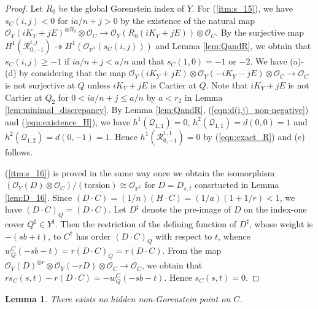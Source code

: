 \documentclass[a4paper,11pt]{amsart}
\newtheorem{lemma}[theorem]{Lemma}
\theoremstyle{definition}
\theoremstyle{remark}
\numberwithin{equation}{section}
\newcommand{\bP}{{\mathbb P}}
\newcommand{\cO}{{\mathcal O}}
\newcommand{\cQ}{{\mathcal Q}}
\newcommand{\calR}{{\mathcal R}}
\newcommand{\torsion}{\mathrm{torsion}}
\begin{document}
\begin{proof}
Let $R_0$ be the global Gorenstein index of $Y$.
For (\ref{itm:s_15}),
we have $s_C(i,j)<0$ for $ia/n+j>0$ by the existence of the natural map
$\cO_Y(iK_Y+jE)^{\otimes R_0} \otimes \cO_C
\to \cO_Y(R_0(iK_Y+jE)) \otimes \cO_C$.
By the surjective map
$H^1(\calR_{0,-1}^{i,j}) \twoheadrightarrow H^1(\cO_{\bP^1}(s_C(i,j)))$
and Lemma \ref{lem:QandR},
we obtain that $s_C(i,j)\ge-1$ if $ia/n+j<a/n$ and that $s_C(1,0)=-1$ or $-2$.
We have (a)-(d) by considering that the map
$\cO_Y(iK_Y+jE) \otimes \cO_Y(-iK_Y-jE) \otimes \cO_C \to \cO_C$
is not surjective at $Q$ unless $iK_Y+jE$ is Cartier at $Q$.
Note that $iK_Y+jE$ is not Cartier at $Q_2$ for $0<ia/n+j\le a/n$
by $a<r_2$ in Lemma \ref{lem:minimal_discrepancy}.
By Lemma \ref{lem:QandR}, (\ref{eqn:d(i,j)_non-negative})
and (\ref{eqn:existence_H}),
we have $h^1(\cQ_{1,1})=0$, $h^2(\cQ_{1,1})=d(0,0)=1$
and $h^2(\cQ_{1,2})=d(0,-1)=1$. 
Hence $h^1(\calR_{0,-1}^{1,1})=0$ by (\ref{eqn:exact_R})
and (e) follows.

(\ref{itm:s_16}) is proved in the same way once we obtain
the isomorphism $(\cO_Y(D) \otimes \cO_C)/(\torsion) \cong \cO_{\bP^1}$
for $D=D_{s,t}$ consrtucted in Lemma \ref{lem:D_16}.
Since $(D \cdot C)=(1/n)(H \cdot C)=(1/a)(1+1/r)<1$,
we have $(D \cdot C)_Q=(D \cdot C)$.
Let $D^\sharp$ denote the pre-image of $D$
on the index-one cover $Q^\sharp \in Y^\sharp$.
Then the restriction of the defining function of $D^\sharp$,
whose weight is $-(sb+t)$,
to $C^\dag$ has order ${(D \cdot C)_Q}$ with respect to $t$,
whence $w_Q^C(-sb-t)=r(D \cdot C)_Q=r(D \cdot C)$.
From the map
$\cO_Y(D)^{\otimes r} \otimes \cO_Y(-rD) \otimes \cO_C \to \cO_C$,
we obtain that $rs_C(s,t)-r(D \cdot C)=-w_Q^C(-sb-t)$.
Hence $s_C(s,t)=0$.
\end{proof}

\begin{lemma}\label{lem:no_more_singularity}
There exists no hidden non-Gorenstein point on $C$.
\end{lemma}
\end{document}
